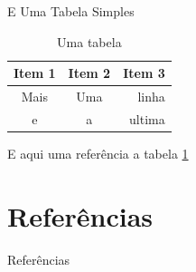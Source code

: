 \documentclass[11pt]{beamer}
\begin{document}
	\begin{frame}{E Uma Tabela Simples}	
		\begin{table}
			\centering
			\begin{tabular}{|c|c r|} %
				\hline %
				Item 1 & Item 2 & Item 3 \\ %
				\hline
				Mais & Uma & linha \\
				e & a & ultima \\ %
				\hline
			\end{tabular}
			\caption{Uma tabela} %
			\label{tab:tab1} %
		\end{table}		
		E aqui uma referência a tabela \ref{tab:tab1} %
	\end{frame}	

	\section{Referências}	
	\begin{frame}[allowframebreaks]{Referências}
	\end{frame}		
	
\end{document}
